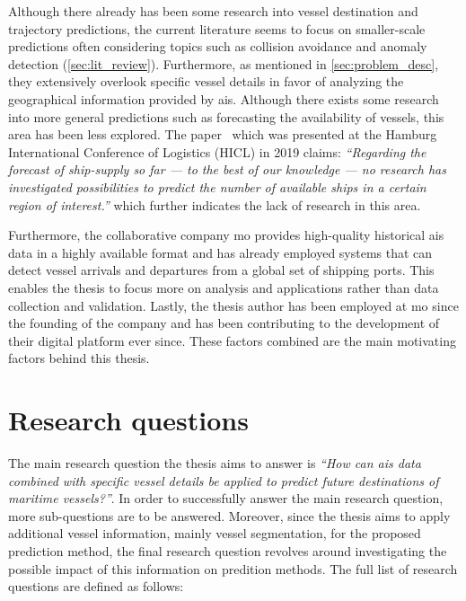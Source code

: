 Although there already has been some research into vessel destination and trajectory predictions, the current literature seems to focus on smaller-scale predictions often considering topics such as collision avoidance and anomaly detection (\cref{sec:lit_review}). Furthermore, as mentioned in \cref{sec:problem_desc}, they extensively overlook specific vessel details in favor of analyzing the geographical information provided by \acrshort{ais}. Although there exists some research into more general predictions such as forecasting the availability of vessels, this area has been less explored. The paper~\cite{lechtenberg2019} which was presented at the Hamburg International Conference of Logistics (HICL) in 2019 claims: \textit{“Regarding the forecast of ship-supply so far --- to the best of our knowledge --- no research has investigated possibilities to predict the number of available ships in a certain region of interest.”} which further indicates the lack of research in this area.

Furthermore, the collaborative company \acrfull{mo} provides high-quality historical \acrshort{ais} data in a highly available format and has already employed systems that can detect vessel arrivals and departures from a global set of shipping ports. This enables the thesis to focus more on analysis and applications rather than data collection and validation. Lastly, the thesis author has been employed at \acrshort{mo} since the founding of the company and has been contributing to the development of their digital platform ever since. These factors combined are the main motivating factors behind this thesis.

\section{Research questions}
\label{sec:research_questions}

The main research question the thesis aims to answer is \textit{``How can \acrshort{ais} data combined with specific vessel details be applied to predict future destinations of maritime vessels?''}. In order to successfully answer the main research question, more sub-questions are to be answered. Moreover, since the thesis aims to apply additional vessel information, mainly vessel segmentation, for the proposed prediction method, the final research question revolves around investigating the possible impact of this information on predition methods. The full list of research questions are defined as follows:


